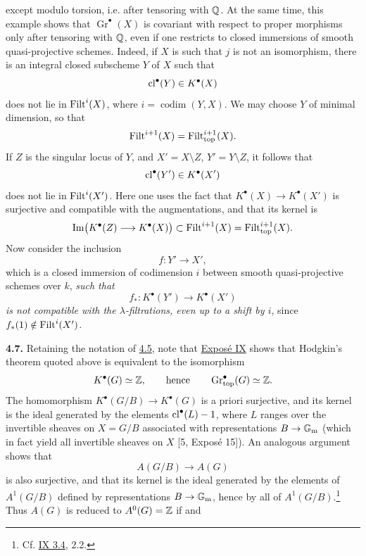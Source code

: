 except modulo torsion, i.e. after tensoring with $\mathbb Q$. At the same time,
this example shows that $\operatorname{Gr}^\bullet(X)$ is covariant with
respect to proper morphisms only after tensoring with $\mathbb Q$, even if one
restricts to closed immersions of smooth quasi-projective schemes. Indeed,
if $X$ is such that $j$ is not an isomorphism, there is an integral closed
subscheme $Y$ of $X$ such that
\[
 \operatorname{cl}^\bullet(Y)\in K^\bullet(X)
\]
does not lie in $\operatorname{Filt}^i(X)$, where $i=\operatorname{codim}(Y,X)$. We may
choose $Y$ of minimal dimension, so that
\[
 \operatorname{Filt}^{i+1}(X)=\operatorname{Filt}_{\mathrm{top}}^{i+1}(X).
\]
If $Z$ is the singular locus of $Y$, and $X'=X\setminus Z$,
$Y'=Y\setminus Z$, it follows that
\[
 \operatorname{cl}^\bullet(Y')\in K^\bullet(X')
\]
does not lie in $\operatorname{Filt}^i(X')$. Here one uses the fact that
$K^\bullet(X)\to K^\bullet(X')$ is surjective and compatible with the
augmentations, and that its kernel is
\[
 \operatorname{Im}\bigl(K^\bullet(Z)\longrightarrow K^\bullet(X)\bigr)
 \subset
 \operatorname{Filt}^{i+1}(X)=\operatorname{Filt}_{\mathrm{top}}^{i+1}(X).
\]
Now consider the inclusion
\[
 f:Y'\longrightarrow X',
\]
which is a closed immersion of codimension $i$ between smooth
quasi-projective schemes over $k$, \emph{such that}
\[
 f_*:K^\bullet(Y')\longrightarrow K^\bullet(X')
\]
\emph{is not compatible with the $\lambda$-filtrations, even up to a shift
by $i$}, since $f_*(1)\notin\operatorname{Filt}^i(X')$.

\noindent{}\textbf{4.7.}
Retaining the notation of \hyperlink{sga6.e14.para.4-5}{4.5}, note that \hyperlink{sga6.e09.expose}{Exposé IX} shows that Hodgkin's
theorem quoted above is equivalent to the isomorphism
\[
 K^\bullet(G)\simeq\mathbb Z,
 \qquad\text{hence}\qquad
 \operatorname{Gr}_{\mathrm{top}}^\bullet(G)\simeq\mathbb Z.
\]
The homomorphism $K^\bullet(G/B)\to K^\bullet(G)$ is a priori surjective,
and its kernel is the ideal generated by the elements
$\operatorname{cl}^\bullet(L)-1$, where $L$ ranges over the invertible sheaves on $X=G/B$
associated with representations $B\to\mathbb G_{\mathrm m}$ (which in fact yield all
invertible sheaves on $X$ [5, Exposé 15]). An analogous argument shows that
\[
 A(G/B)\longrightarrow A(G)
\]
is also surjective, and that its kernel is the ideal generated by the
elements of $A^1(G/B)$ defined by representations $B\to\mathbb G_{\mathrm m}$, hence by all
of $A^1(G/B)$.\footnote{Cf. \hyperlink{sga6.e09.prop.3-4}{IX 3.4}, 2.2.} Thus $A(G)$ is reduced to
$A^0(G)=\mathbb Z$ if and
